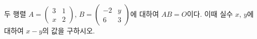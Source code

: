 두 행렬 $A=\begin{pmatrix} 3 & 1 \\ x & 2 \end{pmatrix}$, $B=\begin{pmatrix} -2 & y \\ 6 & 3 \end{pmatrix}$에 대하여 $AB=O$이다. 이때 실수 $x$, $y$에 대하여 $x-y$의 값을 구하시오. 
